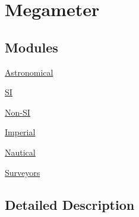 \hypertarget{group___e_g_x_math-_conversions-_length_conversions-_megameter}{}\section{Megameter}
\label{group___e_g_x_math-_conversions-_length_conversions-_megameter}
\subsection*{Modules}
\begin{DoxyCompactItemize}
\item 
\mbox{\hyperlink{group___e_g_x_math-_conversions-_length_conversions-_megameter-_astronomical}{Astronomical}}
\item 
\mbox{\hyperlink{group___e_g_x_math-_conversions-_length_conversions-_megameter-_s_i}{SI}}
\item 
\mbox{\hyperlink{group___e_g_x_math-_conversions-_length_conversions-_megameter-_non-_s_i}{Non-\/\+SI}}
\item 
\mbox{\hyperlink{group___e_g_x_math-_conversions-_length_conversions-_megameter-_imperial}{Imperial}}
\item 
\mbox{\hyperlink{group___e_g_x_math-_conversions-_length_conversions-_megameter-_nautical}{Nautical}}
\item 
\mbox{\hyperlink{group___e_g_x_math-_conversions-_length_conversions-_megameter-_surveyors}{Surveyors}}
\end{DoxyCompactItemize}


\subsection{Detailed Description}
